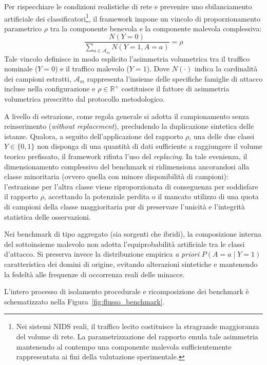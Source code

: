 Per rispecchiare le condizioni realistiche di rete e prevenire uno sbilanciamento artificiale dei classificatori\footnote{Nei sistemi NIDS reali, il traffico lecito costituisce la stragrande maggioranza del volume di rete. La parametrizzazione del rapporto emula tale asimmetria mantenendo al contempo una componente malevola sufficientemente rappresentata ai fini della valutazione sperimentale.}, il framework impone un vincolo di proporzionamento parametrico $\rho$ tra la componente benevola e la componente malevola complessiva:
\begin{equation}
    \frac{N(Y = 0)}{\sum_{a \in \mathcal{A}_m} N(Y = 1, A = a)} = \rho
    \label{eq:rho_constraint}
\end{equation}
Tale vincolo definisce in modo esplicito l'asimmetria volumetrica tra il traffico nominale ($Y = 0$) e il traffico malevolo ($Y = 1$). Dove $N(\cdot)$ indica la cardinalità dei campioni estratti, $\mathcal{A}_m$ rappresenta l'insieme delle specifiche famiglie di attacco incluse nella configurazione e $\rho \in \mathbb{R}^+$ costituisce il fattore di asimmetria volumetrica prescritto dal protocollo metodologico.

A livello di estrazione, come regola generale si adotta il campionamento senza reinserimento (\textit{without replacement}), precludendo la duplicazione sintetica delle istanze. Qualora, a seguito dell'applicazione del rapporto $\rho$, una delle due classi $Y \in \{0, 1\}$ non disponga di una quantità di dati sufficiente a raggiungere il volume teorico prefissato, il framework rifiuta l'uso del \textit{replacing}. In tale evenienza, il dimensionamento complessivo del benchmark si ridimensiona ancorandosi alla classe minoritaria (ovvero quella con minore disponibilità di campioni): l'estrazione per l'altra classe viene riproporzionata di conseguenza per soddisfare il rapporto $\rho$, accettando la potenziale perdita o il mancato utilizzo di una quota di campioni della classe maggioritaria pur di preservare l'unicità e l'integrità statistica delle osservazioni.

Nei benchmark di tipo aggregato (sia sorgenti che ibridi), la composizione interna del sottoinsieme malevolo non adotta l'equiprobabilità artificiale tra le classi d'attacco. Si preserva invece la distribuzione empirica \textit{a priori} $P(A = a \mid Y = 1)$ caratteristica dei domini di origine, evitando alterazioni sintetiche e mantenendo la fedeltà alle frequenze di occorrenza reali delle minacce.

L'intero processo di isolamento procedurale e ricomposizione dei benchmark è schematizzato nella Figura~\ref{fig:flusso_benchmark}.

